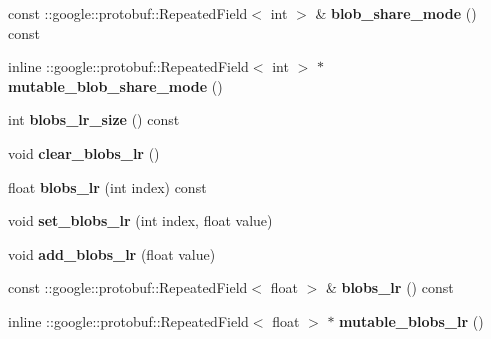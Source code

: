 \begin{DoxyCompactItemize}
const \+::google\+::protobuf\+::\+Repeated\+Field$<$ int $>$ \& {\bfseries blob\+\_\+share\+\_\+mode} () const
\item 
\mbox{\label{classcaffe_1_1_v1_layer_parameter_a6b2661b4e30e0e1acdd1488e58f100ad}} 
inline \+::google\+::protobuf\+::\+Repeated\+Field$<$ int $>$ $\ast$ {\bfseries mutable\+\_\+blob\+\_\+share\+\_\+mode} ()
\item 
\mbox{\label{classcaffe_1_1_v1_layer_parameter_a984d196ebf11b225f424c60da8c3177f}} 
int {\bfseries blobs\+\_\+lr\+\_\+size} () const
\item 
\mbox{\label{classcaffe_1_1_v1_layer_parameter_a3efc8f84b6897c5ce0723bee65a76b22}} 
void {\bfseries clear\+\_\+blobs\+\_\+lr} ()
\item 
\mbox{\label{classcaffe_1_1_v1_layer_parameter_ad8cdd8936a590e67be575a98648a89ae}} 
float {\bfseries blobs\+\_\+lr} (int index) const
\item 
\mbox{\label{classcaffe_1_1_v1_layer_parameter_af3f28ac83432e374bb5356ae133d440d}} 
void {\bfseries set\+\_\+blobs\+\_\+lr} (int index, float value)
\item 
\mbox{\label{classcaffe_1_1_v1_layer_parameter_af1977763deecc574ab53e4864c98269f}} 
void {\bfseries add\+\_\+blobs\+\_\+lr} (float value)
\item 
\mbox{\label{classcaffe_1_1_v1_layer_parameter_ad7946862446368ebb5af7bdfcd7d33eb}} 
const \+::google\+::protobuf\+::\+Repeated\+Field$<$ float $>$ \& {\bfseries blobs\+\_\+lr} () const
\item 
\mbox{\label{classcaffe_1_1_v1_layer_parameter_a569300542eb54d6c953c3d9a8d24a99d}} 
inline \+::google\+::protobuf\+::\+Repeated\+Field$<$ float $>$ $\ast$ {\bfseries mutable\+\_\+blobs\+\_\+lr} ()
\item 
\mbox{\label{classcaffe_1_1_v1_layer_parameter_a88fb879785e76abfd20f37efab6b74bb}} 

\end{DoxyCompactItemize}

